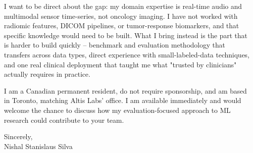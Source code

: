 \documentclass[11pt]{article}
\begin{document}
I want to be direct about the gap: my domain expertise is real-time audio and multimodal sensor time-series, not oncology imaging. I have not worked with radiomic features, DICOM pipelines, or tumor-response biomarkers, and that specific knowledge would need to be built. What I bring instead is the part that is harder to build quickly -- benchmark and evaluation methodology that transfers across data types, direct experience with small-labeled-data techniques, and one real clinical deployment that taught me what "trusted by clinicians" actually requires in practice.

I am a Canadian permanent resident, do not require sponsorship, and am based in Toronto, matching Altis Labs' office. I am available immediately and would welcome the chance to discuss how my evaluation-focused approach to ML research could contribute to your team.

\vspace{1em}
Sincerely, \\
Nishal Stanislaus Silva
\end{document}
